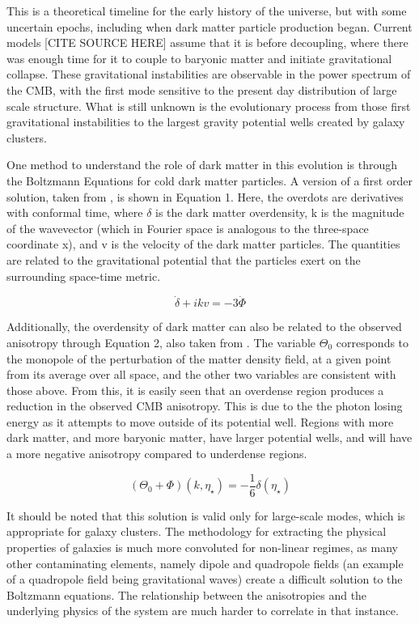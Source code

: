 \documentclass[manuscript]{aastex}
\begin{document}
This is a theoretical timeline for the early history of the universe, but with some uncertain epochs, including when dark matter particle production began. Current models [CITE SOURCE HERE] assume that it is before decoupling, where there was enough time for it to couple to baryonic matter and initiate gravitational collapse. These gravitational instabilities are observable in the power spectrum of the CMB, with the first mode sensitive to the present day distribution of large scale structure. What is still unknown is the evolutionary process from those first gravitational instabilities to the largest gravity potential wells created by galaxy clusters. 

One method to understand the role of dark matter in this evolution is through the Boltzmann Equations for cold dark matter particles. A version of a first order solution, taken from \cite{Dodelson2003}, is shown in Equation 1. Here, the overdots are derivatives with conformal time, where \(\delta\) is the dark matter overdensity, k is the magnitude of the wavevector (which in Fourier space is analogous to the three-space coordinate x), and v is the velocity of the dark matter particles. The quantities are related to the gravitational potential that the particles exert on the surrounding space-time metric.

\begin{equation}
\dot{\delta} + ikv = -3\dot{\Phi}
\end{equation}

Additionally, the overdensity of dark matter can also be related to the observed anisotropy  through Equation 2, also taken from \cite{Dodelson2003}. The variable \(\Theta_{0}\) corresponds to the monopole of the perturbation of the matter density field, at a given point from its average over all space, and the other two variables are consistent with those above. From this, it is easily seen that an overdense region produces a reduction in the observed CMB anisotropy. This is due to the the photon losing energy as it attempts to move outside of its potential well. Regions with more dark matter, and more baryonic matter, have larger potential wells, and will have a more negative anisotropy compared to underdense regions. 

\begin{equation}
(\Theta_{0} + \Phi)(k,\eta_{\star}) = -\frac{1}{6} \delta(\eta_{\star})
\end{equation}

It should be noted that this solution is valid only for large-scale modes, which is appropriate for galaxy clusters. The methodology for extracting the physical properties of galaxies is much more convoluted for non-linear regimes, as many other contaminating elements, namely dipole and quadropole fields (an example of a quadropole field being gravitational waves) create a difficult solution to the Boltzmann equations. The relationship between the anisotropies and the underlying physics of the system are much harder to correlate in that instance. 
\end{document}
